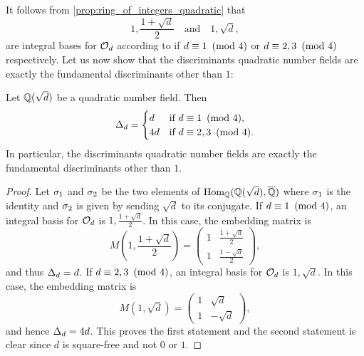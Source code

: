     It follows from \cref{prop:ring_of_integers_quadratic} that
    \[
      1,\frac{1+\sqrt{d}}{2} \quad \text{and} \quad 1,\sqrt{d},
    \]
    are integral bases for $\mathcal{O}_{d}$ according to if $d \equiv 1 \ \left(\text{mod }4\right)$ or $d \equiv 2,3 \ \left(\text{mod }4\right)$ respectively. Let us now show that the discriminants quadratic number fields are exactly the fundamental discriminants other than $1$:

    \begin{proposition}\label{prop:discriminant_quadratic}
      Let $\mathbb{Q}(\sqrt{d})$ be a quadratic number field. Then
      \[
        \Delta_{d} = \begin{cases} d & \text{if $d \equiv 1 \ \left(\text{mod }4\right)$}, \\ 4d & \text{if $d \equiv 2,3 \ \left(\text{mod }4\right)$}. \end{cases}
      \]
      In particular, the discriminants quadratic number fields are exactly the fundamental discriminants other than $1$.
    \end{proposition}
    \begin{proof}
      Let $\sigma_{1}$ and $\sigma_{2}$ be the two elements of $\operatorname{\mathrm{Hom}}_{\mathbb{Q}}(\mathbb{Q}(\sqrt{d}),\overline{\mathbb{Q}})$ where $\sigma_{1}$ is the identity and $\sigma_{2}$ is given by sending $\sqrt{d}$ to its conjugate. If $d \equiv 1 \ \left(\text{mod }4\right)$, an integral basis for $\mathcal{O}_{d}$ is $1,\frac{1+\sqrt{d}}{2}$. In this case, the embedding matrix is
      \[
        M\left(1,\frac{1+\sqrt{d}}{2}\right) = \begin{pmatrix} 1 & \frac{1+\sqrt{d}}{2} \\ 1 & \frac{1-\sqrt{d}}{2} \end{pmatrix},
      \]
      and thus $\Delta_{d} = d$. If $d \equiv 2,3 \ \left(\text{mod }4\right)$, an integral basis for $\mathcal{O}_{d}$ is $1,\sqrt{d}$. In this case, the embedding matrix is
      \[
        M(1,\sqrt{d}) = \begin{pmatrix} 1 & \sqrt{d} \\ 1 & -\sqrt{d} \end{pmatrix},
      \]
      and hence $\Delta_{d} = 4d$. This proves the first statement and the second statement is clear since $d$ is square-free and not $0$ or $1$.
    \end{proof}

